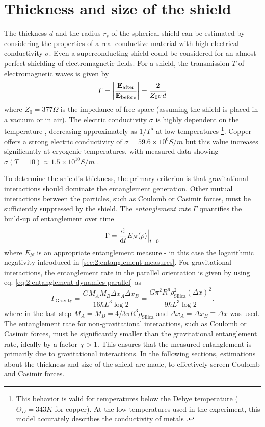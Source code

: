 \section{Thickness and size of the shield}\label{sec:5:shield-size}
The thickness $d$ and the radius $r_s$ of the spherical shield can be estimated by considering the properties of a real conductive material with high electrical conductivity $\sigma$.
Even a superconducting shield could be considered for an almost perfect shielding of electromagnetic fields.
For a shield, the transmission $T$ of electromagnetic waves is given by \cite{Vandenbosch_2022}
\begin{equation}
  T = \abs{\frac{\vec{E}_\mathrm{after}}{\vec{E}_\mathrm{before}}} = \frac{2}{Z_0 \sigma d}
\end{equation}
where $Z_0 = 377\si{\Omega}$ is the impedance of free space (assuming the shield is placed in a vacuum or in air).
The electric conductivity $\sigma$ is highly dependent on the temperature \cite[p. 284-286]{Gross_2018}, decreasing approximately as $1/T^5$ at low temperatures \footnote{This behavior is valid for temperatures below the Debye temperature ($\Theta_D = 343\si{K}$ for copper). At the low temperatures used in the experiment, this model accurately describes the conductivity of metals \cite{Berman_1952}.}.
Copper offers a strong electric conductivity of $\sigma = 59.6\times 10^6 \si{S/m}$ but this value increases significantly at cryogenic temperatures, with measured data showing $\sigma(T = 10) \approx 1.5\times 10^{10}\si{S/m}$ \cite{Berman_1952}.

To determine the shield's thickness, the primary criterion is that gravitational interactions should dominate the entanglement generation.
Other mutual interactions between the particles, such as Coulomb or Casimir forces, must be sufficiently suppressed by the shield.
The \emph{entanglement rate} $\Gamma$ quantifies the build-up of entanglement over time
\begin{equation}\label{eq:5:entanglement-rate}
  \Gamma = \dv{t} E_N(\rho)\Big|_{t=0}
\end{equation} 
where $E_N$ is an appropriate entanglement measure - in this case the logarithmic negativity \cite{Plenio_2005} introduced in \cref{sec:2:entanglement-measures}.
For gravitational interactions, the entanglement rate in the parallel orientation is given by using eq. \eqref{eq:2:entanglement-dynamics-parallel} as
\begin{equation}\label{eq:5:entanglement-rate-gravity}
  \Gamma_\mathrm{Gravity} = \frac{G M_A M_B \Delta x_A \Delta x_B}{16 \hbar L^3 \log 2} = \frac{G \pi^2 R^6 \rho_\mathrm{Silica}^2 (\Delta x)^2}{9 \hbar L^3 \log 2} .
\end{equation}
where in the last step $M_A = M_B = 4/3 \pi R^3 \rho_\mathrm{Silica}$ and $\Delta x_A = \Delta x_B \equiv \Delta x$ was used.
The entanglement rate for non-gravitational interactions, such as Coulomb or Casimir forces, must be significantly smaller than the gravitational entanglement rate, ideally by a factor $\chi > 1$.
This ensures that the measured entanglement is primarily due to gravitational interactions.
In the following sections, estimations about the thickness and size of the shield are made, to effectively screen Coulomb and Casimir forces.


